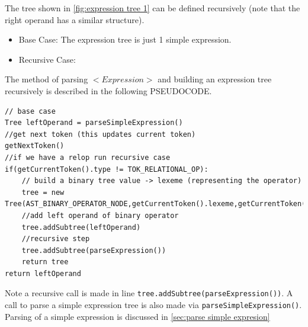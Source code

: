 The tree shown in \ref{fig:expression tree 1} can be defined recursively (note that the right operand has a similar structure).
\begin{itemize}
	\item Base Case: The expression tree is just 1 simple expression.
	      \begin{center}
	      \end{center}
	\item Recursive Case:
	      \begin{center}
	      \end{center}
\end{itemize}

The method of parsing $<Expression>$ and building an expression tree recursively is described in the following PSEUDOCODE.
\begin{lstlisting}[caption=PSEUDOCODE : parsing \emph{<Expression>} and building an expression tree (\emph{parseExpression()})]
// base case
Tree leftOperand = parseSimpleExpression()
//get next token (this updates current token) 
getNextToken()
//if we have a relop run recursive case
if(getCurrentToken().type != TOK_RELATIONAL_OP):
    // build a binary tree value -> lexeme (representing the operator)
    tree = new Tree(AST_BINARY_OPERATOR_NODE,getCurrentToken().lexeme,getCurrentToken().lineNumber)
    //add left operand of binary operator
    tree.addSubtree(leftOperand)
    //recursive step
    tree.addSubtree(parseExpression())
    return tree
return leftOperand
\end{lstlisting}
Note a recursive call is made in line \verb!tree.addSubtree(parseExpression())!. A call to parse a simple expression tree is also made via \verb!parseSimpleExpression()!. Parsing of a simple expression is discussed in \ref{sec:parse simple expresion}




